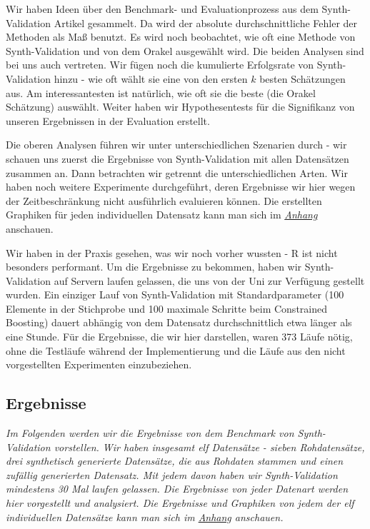 \documentclass[12pt,a4paper,twoside]{scrartcl}
\numberwithin{equation}{section}
\begin{document}
\noindent
Wir haben Ideen über den Benchmark- und Evaluationprozess aus dem Synth-Validation Artikel \cite{schuler2017synth} gesammelt. Da wird der absolute durchschnittliche Fehler der Methoden als Maß benutzt. Es wird noch beobachtet, wie oft eine Methode von Synth-Validation und von dem Orakel ausgewählt wird. Die beiden Analysen sind bei uns auch vertreten. Wir fügen noch die kumulierte Erfolgsrate von Synth-Validation hinzu - wie oft wählt sie eine von den ersten $k$ besten Schätzungen aus. Am interessantesten ist natürlich, wie oft sie die beste (die Orakel Schätzung) auswählt. Weiter haben wir Hypothesentests für die Signifikanz von unseren Ergebnissen in der Evaluation erstellt. \par  

\noindent
Die oberen Analysen führen wir unter unterschiedlichen Szenarien durch - wir schauen uns zuerst die Ergebnisse von Synth-Validation mit allen Datensätzen zusammen an. Dann betrachten wir getrennt die unterschiedlichen Arten. Wir haben noch weitere Experimente durchgeführt, deren Ergebnisse wir hier wegen der Zeitbeschränkung nicht ausführlich evaluieren können. Die erstellten Graphiken für jeden individuellen Datensatz kann man sich im \emph{\hyperref[anhang]{Anhang}} anschauen. \par

\noindent
Wir haben in der Praxis gesehen, was wir noch vorher wussten - R ist nicht besonders performant. Um die Ergebnisse zu bekommen, haben wir Synth-Validation auf Servern laufen gelassen, die uns von der Uni zur Verfügung gestellt wurden. Ein einziger Lauf von Synth-Validation mit Standardparameter (100 Elemente in der Stichprobe und 100 maximale Schritte beim Constrained Boosting) dauert abhängig von dem Datensatz durchschnittlich etwa länger als eine Stunde. Für die Ergebnisse, die wir hier darstellen, waren 373 Läufe nötig, ohne die Testläufe während der Implementierung und die Läufe aus den nicht vorgestellten Experimenten einzubeziehen. \par  

\subsection{Ergebnisse}\label{subsec:ergebnisse} 
\noindent
\emph{Im Folgenden werden wir die Ergebnisse von dem Benchmark von Synth-Validation vorstellen. Wir haben insgesamt elf Datensätze - sieben Rohdatensätze, drei synthetisch generierte Datensätze, die aus Rohdaten stammen und einen zufällig generierten Datensatz. Mit jedem davon haben wir Synth-Validation mindestens 30 Mal laufen gelassen. Die Ergebnisse von jeder Datenart werden hier vorgestellt und analysiert. Die Ergebnisse und Graphiken von jedem der elf individuellen Datensätze kann man sich im \emph{\hyperref[anhang]{Anhang}} anschauen.}\par
\end{document}
